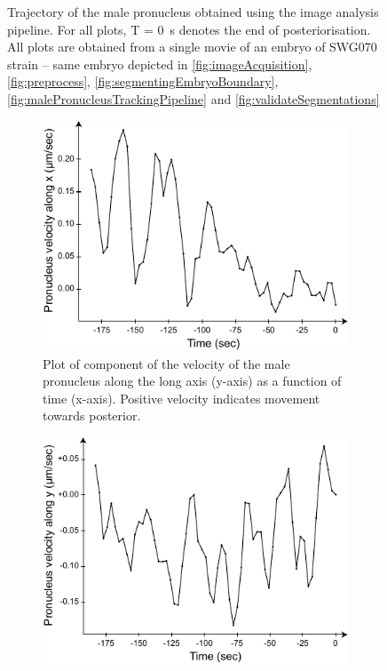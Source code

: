 \begin{figure}[p]
\caption[Image analysis: Trajectory of male pronucleus]{Trajectory of the male pronucleus obtained using the image analysis pipeline. For all plots, T = \SI{0}{\second} denotes the end of posteriorisation. All plots are obtained from a single movie of an embryo of SWG070 strain -- same embryo depicted in \autoref{fig:imageAcquisition}, \autoref{fig:preprocess}, \autoref{fig:segmentingEmbryoBoundary}, \autoref{fig:malePronucleusTrackingPipeline} and \autoref{fig:validateSegmentations}}
\label{fig:malePronucleusTrackingResults}
\end{figure}

\begin{figure}[p]
\centering

\begin{subfigure}[t]{0.45\textwidth}
    \centering
    \includegraphics[width=\textwidth]{ExpMethods/FigTrackNucleus/vxVsTime.pdf}
    \caption{Plot of component of the velocity of the male pronucleus along the long axis (y-axis) as a function of time (x-axis). Positive velocity indicates movement towards posterior.} 
    \label{subfig:malePronucleusTrackingVelocities-vxVsTime}
\end{subfigure}
\hfill
\begin{subfigure}[t]{0.45\textwidth}
    \centering
    \includegraphics[width=\textwidth]{ExpMethods/FigTrackNucleus/vyVsTime.pdf}

\end{subfigure}
\end{figure}
